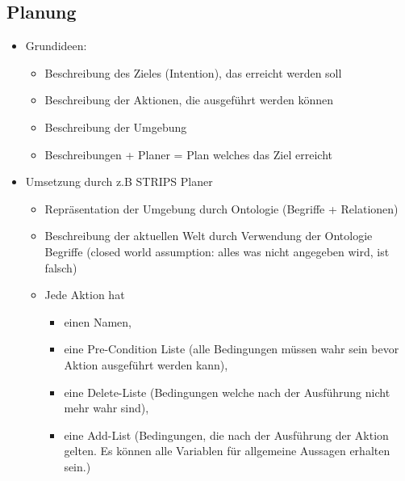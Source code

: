 \documentclass{article} %
\begin{document}
	\subsection{Planung}
	\begin{itemize}
		\item Grundideen:
		\begin{itemize}
			\item Beschreibung des Zieles (Intention), das erreicht werden soll
			\item Beschreibung der Aktionen, die ausgeführt werden können
			\item Beschreibung der Umgebung
			\item Beschreibungen + Planer = Plan welches das Ziel erreicht
		\end{itemize}
		\item Umsetzung durch z.B STRIPS Planer
		\begin{itemize}
			\item Repräsentation der Umgebung durch Ontologie (Begriffe + Relationen)
			\item Beschreibung der aktuellen Welt durch Verwendung der Ontologie Begriffe (closed world assumption: alles was nicht angegeben wird, ist falsch)
			\item Jede Aktion hat 
				\begin{itemize}
				\item einen Namen, 
				\item eine Pre-Condition Liste (alle Bedingungen müssen wahr sein bevor Aktion ausgeführt werden kann),
				\item eine Delete-Liste (Bedingungen welche nach der Ausführung nicht mehr wahr sind), 
				\item eine Add-List (Bedingungen, die nach der Ausführung der Aktion gelten. Es können alle Variablen für allgemeine Aussagen erhalten sein.)
				\end{itemize}
			

\end{itemize}
\end{itemize}
\end{document}
